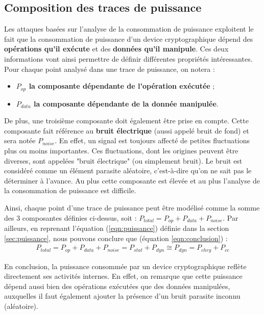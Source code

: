 \documentclass[oneside]{book}
\begin{document}
\subsection{Composition des traces de puissance}
Les attaques basées sur l'analyse de la consommation de puissance exploitent le fait que la consommation de puissance d'un device cryptographique dépend des \textbf{opérations qu'il exécute} et des \textbf{données qu'il manipule}. Ces deux informations vont ainsi permettre de définir différentes propriétés intéressantes. Pour chaque point analysé dans une trace de puissance, on notera :
\begin{itemize}
\item \textbf{$P_{op}$ la composante dépendante de l'opération exécutée} ;
\item \textbf{$P_{data}$ la composante dépendante de la donnée manipulée}. \\
\end{itemize}
De plus, une troisième composante doit également être prise en compte. Cette composante fait référence au \textbf{bruit électrique} (aussi appelé bruit de fond) et sera notée \textbf{$P_{noise}$}. En effet, un signal est toujours affecté de petites fluctuations plus ou moins importantes. Ces fluctuations, dont les origines peuvent être diverses, sont appelées "bruit électrique" (ou simplement bruit). Le bruit est considéré comme un élément parasite aléatoire, c'est-à-dire qu'on ne sait pas le déterminer à l'avance. Au plus cette composante est élevée et au plus l'analyse de la consommation de puissance est difficile.

\hspace{-0.5cm}Ainsi, chaque point d'une trace de puissance peut être modélisé comme la somme des 3 composantes définies ci-dessus, soit : 
$P_{total} = P_{op} + P_{data} + P_{noise}$. Par ailleurs, en reprenant l'équation (\ref{eqn:puissance}) définie dans la section \ref{sec:puissance}, nous pouvons conclure que (équation \ref{eqn:conclusion}) :
\begin{gather}
	P_{total} = P_{op} + P_{data} + P_{noise} = P_{stat} + P_{dyn} \cong  P_{dyn} = P_{chrg} + P_{cc}\label{eqn:conclusion}
\end{gather}

En conclusion, la puissance consommée par un device cryptographique reflète directement ses activités internes. En effet, on remarque que cette puissance dépend aussi bien des opérations exécutées que des données manipulées, auxquelles il faut également ajouter la présence d'un bruit parasite inconnu (aléatoire). 
\end{document}
